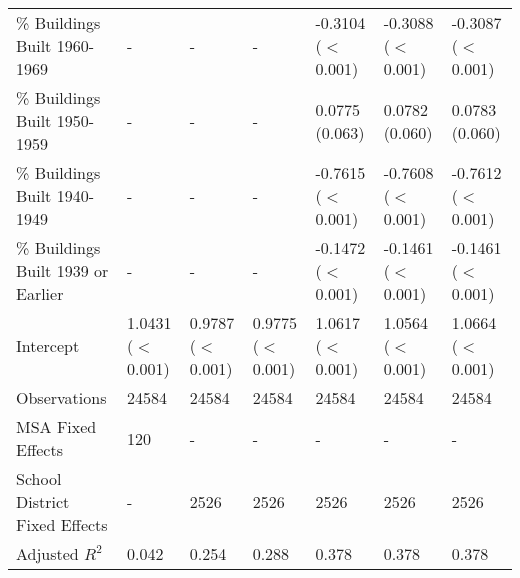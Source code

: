 \begin{table}[h]
\begin{tabular}{l|llllll}
\% Buildings Built 1960-1969 &- & - & - & -0.3104 ($<$0.001) & -0.3088 ($<$0.001) & -0.3087 ($<$0.001) \\
\% Buildings Built 1950-1959 &- & - & - & 0.0775 (0.063) & 0.0782 (0.060) & 0.0783 (0.060) \\
\% Buildings Built 1940-1949 &- & - & - & -0.7615 ($<$0.001) & -0.7608 ($<$0.001) & -0.7612 ($<$0.001) \\
\% Buildings Built 1939 or Earlier &- & - & - & -0.1472 ($<$0.001) & -0.1461 ($<$0.001) & -0.1461 ($<$0.001) \\
Intercept &1.0431 ($<$0.001) & 0.9787 ($<$0.001) & 0.9775 ($<$0.001) & 1.0617 ($<$0.001) & 1.0564 ($<$0.001) & 1.0664 ($<$0.001) \\
Observations &24584 & 24584 & 24584 & 24584 & 24584 & 24584 \\
MSA Fixed Effects &120 & - & - & - & - & - \\
School District Fixed Effects &- & 2526 & 2526 & 2526 & 2526 & 2526 \\
Adjusted $R^2$ &0.042 & 0.254 & 0.288 & 0.378 & 0.378 & 0.378 \\\hline
\end{tabular}
\end{table}
